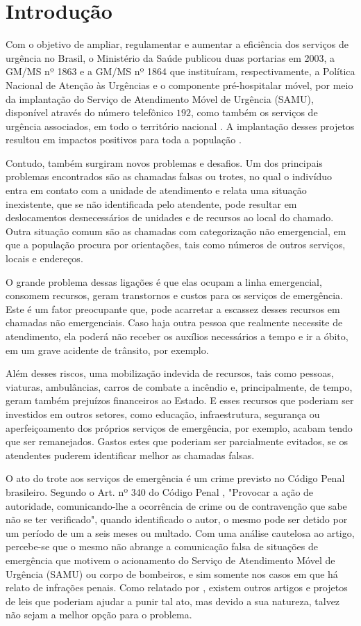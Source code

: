 \chapter{Introdução}
Com o objetivo de ampliar, regulamentar e aumentar a eficiência dos serviços de urgência no Brasil, o Ministério da Saúde publicou duas portarias em 2003, a GM/MS nº 1863 e a GM/MS nº 1864 que instituíram, respectivamente, a Política Nacional de Atenção às Urgências e o componente pré-hospitalar móvel, por meio da implantação do Serviço de Atendimento Móvel de Urgência (SAMU), disponível através do número telefônico $192$, como também os serviços de urgência associados, em todo o território nacional \citep{p1863, p1864}. A implantação desses projetos resultou em impactos positivos para toda a população \citep{VIEIRA2008, MACHADO2011, MINAYO2008}. 

Contudo, também surgiram novos problemas e desafios. Um dos principais problemas encontrados são as chamadas falsas ou trotes, no qual o indivíduo entra em contato com a unidade de atendimento e relata uma situação inexistente, que se não identificada pelo atendente, pode resultar em deslocamentos desnecessários de unidades e de recursos ao local do chamado. Outra situação comum são as chamadas com categorização não emergencial, em que a população procura por orientações, tais como números de outros serviços, locais e endereços. 

O grande problema dessas ligações é que elas ocupam a linha emergencial, consomem recursos, geram transtornos e custos para os serviços de emergência. Este é um fator preocupante que, pode acarretar a escassez desses recursos em chamadas não emergenciais. Caso haja outra pessoa que realmente necessite de atendimento, ela poderá não receber os auxílios necessários a tempo e ir a óbito, em um grave acidente de trânsito, por exemplo.

Além desses riscos, uma mobilização indevida de recursos, tais como pessoas, viaturas, ambulâncias, carros de combate a incêndio e, principalmente, de tempo, geram também prejuízos financeiros ao Estado. E esses recursos que poderiam ser investidos em outros setores, como educação, infraestrutura, segurança ou aperfeiçoamento dos próprios serviços de emergência, por exemplo, acabam tendo que ser remanejados. Gastos estes que poderiam ser parcialmente evitados, se os atendentes puderem identificar melhor as chamadas falsas.

O ato do trote aos serviços de emergência é um crime previsto no Código Penal brasileiro. Segundo o Art. nº 340 do Código Penal \citep{cp340}, "Provocar a ação de autoridade, comunicando-lhe a ocorrência de crime ou de contravenção que sabe não se ter verificado", quando identificado o autor, o mesmo pode ser detido por um período de um a seis meses ou multado. Com uma análise cautelosa ao artigo, percebe-se que o mesmo não abrange a comunicação falsa de situações de emergência que motivem o acionamento do Serviço de Atendimento Móvel de Urgência (SAMU) ou corpo de bombeiros, e sim somente nos casos em que há relato de infrações penais. Como relatado por \cite{peixoto2015combate}, existem outros artigos e projetos de leis que poderiam ajudar a punir tal ato, mas devido a sua natureza, talvez não sejam a melhor opção para o problema. 


